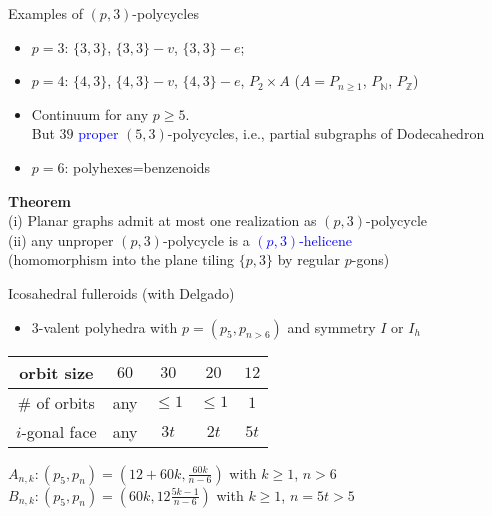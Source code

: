 \documentclass[%
pdf,
colorBG,
slideColor,
]{prosper}
\newcommand{\NN}{\ensuremath{\mathbb{N}}}
\newcommand{\ZZ}{\ensuremath{\mathbb{Z}}}
\begin{document}
\begin{slide}{Examples of $(p,3)$-polycycles}
\begin{itemize}
\item $p=3$: $\{3,3\}$, $\{3,3\}-v$, $\{3,3\}-e$;
\item $p=4$: $\{4,3\}$, $\{4,3\}-v$, $\{4,3\}-e$, $P_2\times A$ ($A=P_{n\geq 1}$, $P_{\NN}$, $P_{\ZZ}$)
\item Continuum for any $p\geq 5$.\\
But $39$ \textcolor{blue}{proper} $(5,3)$-polycycles, i.e., partial subgraphs of Dodecahedron
\item $p=6$: polyhexes=benzenoids
\end{itemize}
{\bf Theorem}\\
(i) Planar graphs admit at most one realization as $(p,3)$-polycycle\\
(ii) any unproper $(p,3)$-polycycle is a \textcolor{blue}{$(p,3)$-helicene}\\
(homomorphism into the plane tiling $\{p,3\}$ by regular
$p$-gons)
\end{slide}









\begin{slide}{Icosahedral fulleroids (with Delgado)}

\begin{itemize}
\item $3$-valent polyhedra with $p=(p_5, p_{n>6})$ and symmetry $I$ or $I_h$
\end{itemize}


\begin{center}
\begin{tabular}{|c|c|c|c|c|}
\hline
orbit size & $60$ & $30$ & $20$ & $12$\\
\hline
\# of orbits &any & $\leq 1$& $\leq 1$& $1$\\
\hline
$i$-gonal face &any & $3t$ &$2t$ & $5t$\\
\hline
\end{tabular}
\end{center}

$A_{n,k} : (p_5, p_n)=(12+60k, \frac{60k}{n-6})$ with $k\geq 1$, $n>6$\\

$B_{n,k} : (p_5, p_n)=(60k, 12\frac{5k-1}{n-6})$ with $k\geq 1$, $n=5t>5$

\end{slide}
\end{document}
